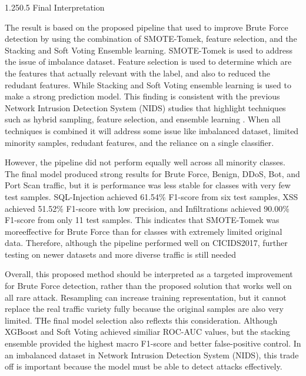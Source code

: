\documentclass[12pt,a4paper]{article}
\makeatletter
\renewcommand{\subsection}{\@startsection{subsection}{2}{0pt}%
  {1.25\baselineskip}{0.5\baselineskip}%
  {\normalfont\fontsize{13}{15.6}\selectfont\bfseries}}
\makeatother
\begin{document}
\subsection{Final Interpretation}

The result is based on the proposed pipeline that used to improve Brute Force detection by using the combination of SMOTE-Tomek, feature selection, and the Stacking and Soft Voting Ensemble learning. SMOTE-Tomek is used to address the issue of imbalance dataset. Feature selection is used to determine which are the features that actually relevant with the label, and also to reduced the redudant features. While Stacking and Soft Voting ensemble learning is used to make a strong prediction model. This finding is consistent with the previous Network Intrusion Detection System (NIDS) studies that highlight techniques such as hybrid sampling, feature selection, and ensemble learning \parencite{khan2024balanced,nassreddine2025ensemble,alsaffar2024shielding,farooqi2024enhancing,urmi2024stacked}. When all techniques is combined it will address some issue like imbalanced dataset, limited minority samples, redudant features, and the reliance on a single classifier. 

However, the pipeline did not perform equally well across all minority classes. The final model produced strong results for Brute Force, Benign, DDoS, Bot, and Port Scan traffic, but it is performance was less stable for classes with very few test samples. SQL-Injection achieved 61.54\% F1-score from six test samples, XSS achieved 51.52\% F1-score with low precision, and Infiltrations achieved 90.00\% F1-score from only 11 test samples.  This indicates that SMOTE-Tomek was moreeffective for Brute Force than for classes with extremely limited original data. Therefore, although the pipeline performed well on CICIDS2017, further testing on newer datasets and more diverse traffic is still needed

Overall, this proposed method should be interpreted as a targeted improvement for Brute Force detection, rather than the proposed solution that works well on all rare attack. Resampling can increase training representation, but it cannot replace the real traffic variety fully because the original samples are also very limited. THe final model selection also reflexts this consideration. Although XGBoost and Soft Voting achieved similiar ROC-AUC values, but the stacking ensemble provided the highest macro F1-score and better false-positive control. In an imbalanced dataset in Network Intrusion Detection System (NIDS), this trade off is important because the model must be able to detect attacks effectively.
\end{document}
